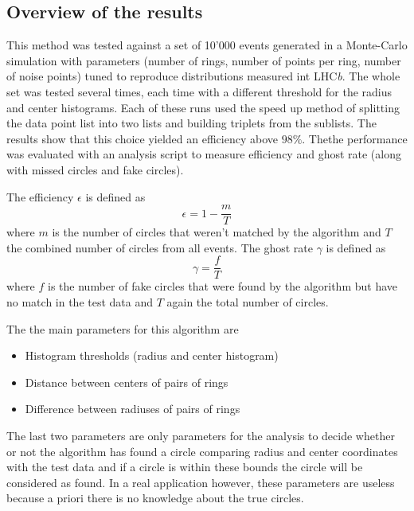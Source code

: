 \documentclass[11pt,twoside]{scrreprt}
\begin{document}
\subsection{Overview of the results} %
\label{sub:overview_of_the_results}

This method was tested against a set of 10'000 events generated in a Monte-Carlo simulation with parameters (number of rings, 
number of points per ring, number of noise points) tuned to reproduce distributions measured int LHC\textit{b}. 
The whole set was tested several times, each time with a different threshold for the radius and center histograms. 
Each of these runs used the speed up method of splitting the data point list into two lists and building triplets from 
the sublists. The results show that this choice yielded an efficiency above $98\%$. 
Thethe performance was evaluated with an analysis script to measure efficiency and ghost rate (along with missed 
circles and fake circles).

The efficiency $\epsilon$ is defined as 
\begin{equation}
\epsilon = 1 - \frac{m}{T}    
\end{equation}
where $m$ is the number of circles that weren't matched by the algorithm and $T$ the combined number of circles from
all events. The ghost rate $\gamma$ is defined as 
\begin{equation}
  \gamma = \frac{f}{T} 
\end{equation}
where $f$ is the number of fake circles that were found by the algorithm but have no match in the test data and $T$ again the
total number of circles.


The the main parameters for this algorithm are
\begin{itemize}
  \item Histogram thresholds (radius and center histogram)
  \item Distance between centers of pairs of rings
  \item Difference between radiuses of pairs of rings
\end{itemize}

The last two parameters are only parameters for the analysis to decide whether or not the algorithm has found a circle comparing radius
and center coordinates with the test data and if a circle is within these bounds the circle will be considered as found. In a real application
however, these parameters are useless because a priori there is no knowledge about the true circles.
\end{document}
